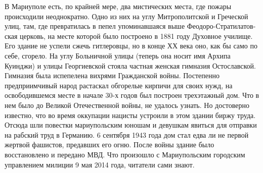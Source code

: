
В Мариуполе есть, по крайней мере, два мистических места, где пожары
происходили неоднократно. Одно из них на углу Митрополитской и Греческой улиц,
там, где превратилась в пепел упоминавшаяся выше Феодоро-Стратилатов\hyp{}ская
церковь, на месте которой было построено в 1881 году Духовное училище. Его
здание не успели сжечь гитлеровцы, но в конце ХХ века оно, как бы само по себе,
сгорело. На углу Больничной улицы (теперь она носит имя Архипа Куинджи) и улицы
Георгиевской стояла частная женская гимназия Остославской. Гимназия была
испепелена  вихрями Гражданской войны. Постепенно предприимчивый народ
растаскал обгорелые кирпичи для своих нужд, на освободившемся месте в начале
30-х годов был построен трехэтажный дом. Что в нем было до Великой
Отечественной войны, не удалось узнать. Но достоверно известно, что во время
оккупации нацисты устроили в этом здании биржу труда. Отсюда шли повестки
мариупольским юношам и девушкам явиться для отправки на рабский труд в
Германию. 6 сентября 1943 года дом стал едва ли не первой жертвой фашистов,
предавших его огню. После войны здание было восстановлено и передано МВД. Что
произошло с Мариупольским  городским управлением милиции 9 мая 2014 года,
читатели сами знают. 
